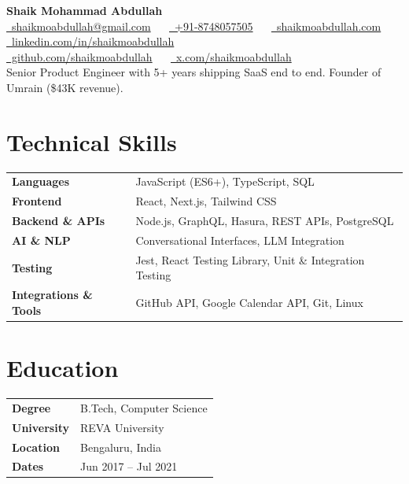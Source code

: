 \documentclass[letterpaper,10.5pt]{article}
\newcommand{\skill}[2]{\textbf{#1} & #2 \\}
\begin{document}
\begin{center}
  {\Huge\bfseries Shaik Mohammad Abdullah}\\[5pt]
  {\footnotesize
    \href{mailto:shaikmoabdullah@gmail.com}{\faEnvelope\ shaikmoabdullah@gmail.com} \ \textbar\ %
    \href{https://wa.me/918748057505}{\faWhatsapp\ +91-8748057505} \ \textbar\ %
    \href{https://shaikmoabdullah.com}{\faGlobe\ shaikmoabdullah.com} \ \textbar\ %
    \mbox{\href{https://linkedin.com/in/shaikmoabdullah}{\faLinkedin\ linkedin.com/in/shaikmoabdullah}}\\
    \mbox{\href{https://github.com/shaikmoabdullah}{\faGithub\ github.com/shaikmoabdullah}} \ \textbar\ %
    \mbox{\href{https://x.com/shaikmoabdullah}{\faTwitter\ x.com/shaikmoabdullah}}
  }\\[4pt]
  {\small Senior Product Engineer with 5+ years shipping SaaS end to end. Founder of Umrain (\$43K revenue).}
\end{center}

\noindent
\begin{minipage}[t]{0.66\textwidth}
\section{Technical Skills}
\begin{tabularx}{\linewidth}{@{}l >{\raggedright\arraybackslash}X@{}}
  \skill{Languages}{JavaScript (ES6+), TypeScript, SQL}
  \skill{Frontend}{React, Next.js, Tailwind CSS}
  \skill{Backend \& APIs}{Node.js, GraphQL, Hasura, REST APIs, PostgreSQL}
  \skill{AI \& NLP}{Conversational Interfaces, LLM Integration}
  \skill{Testing}{Jest, React Testing Library, Unit \& Integration Testing}
  \skill{Integrations \& Tools}{GitHub API, Google Calendar API, Git, Linux}
\end{tabularx}
\end{minipage}\hfill
\begin{minipage}[t]{0.31\textwidth}
\section{Education}
\begin{tabularx}{\linewidth}{@{}l >{\raggedright\arraybackslash}X@{}}
  \skill{Degree}{B.Tech, Computer Science}
  \skill{University}{REVA University}
  \skill{Location}{Bengaluru, India}
  \skill{Dates}{Jun 2017 -- Jul 2021}
\end{tabularx}
\end{minipage}
\end{document}
